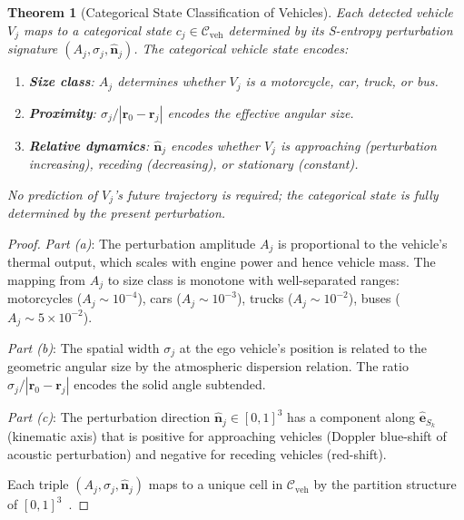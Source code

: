 \documentclass[twocolumn,10pt]{article}
\newtheorem{theorem}{Theorem}[section]
\theoremstyle{definition}
\theoremstyle{remark}
\begin{document}
\begin{theorem}[Categorical State Classification of Vehicles]\label{thm:vehicle-classification}
Each detected vehicle $V_j$ maps to a categorical state
$c_j \in \mathcal{C}_{\mathrm{veh}}$ determined by its S-entropy
perturbation signature $(A_j, \sigma_j, \hat{\mathbf{n}}_j)$. The
categorical vehicle state encodes:
\begin{enumerate}[label=(\alph*)]
  \item \textbf{Size class}: $A_j$ determines whether $V_j$ is a
    motorcycle, car, truck, or bus.
  \item \textbf{Proximity}: $\sigma_j / |\mathbf{r}_0 - \mathbf{r}_j|$
    encodes the effective angular size.
  \item \textbf{Relative dynamics}: $\hat{\mathbf{n}}_j$ encodes whether
    $V_j$ is approaching (perturbation increasing), receding (decreasing),
    or stationary (constant).
\end{enumerate}
No prediction of $V_j$'s future trajectory is required; the categorical
state is fully determined by the present perturbation.
\end{theorem}

\begin{proof}
\emph{Part (a)}: The perturbation amplitude $A_j$ is proportional to the
vehicle's thermal output, which scales with engine power and hence vehicle
mass. The mapping from $A_j$ to size class is monotone with well-separated
ranges: motorcycles ($A_j \sim 10^{-4}$), cars ($A_j \sim 10^{-3}$),
trucks ($A_j \sim 10^{-2}$), buses ($A_j \sim 5 \times 10^{-2}$).

\emph{Part (b)}: The spatial width $\sigma_j$ at the ego vehicle's
position is related to the geometric angular size by the atmospheric
dispersion relation. The ratio $\sigma_j / |\mathbf{r}_0 - \mathbf{r}_j|$
encodes the solid angle subtended.

\emph{Part (c)}: The perturbation direction $\hat{\mathbf{n}}_j \in
[0,1]^3$ has a component along $\hat{\mathbf{e}}_{S_k}$ (kinematic axis)
that is positive for approaching vehicles (Doppler blue-shift of acoustic
perturbation) and negative for receding vehicles (red-shift).

Each triple $(A_j, \sigma_j, \hat{\mathbf{n}}_j)$ maps to a unique cell
in $\mathcal{C}_{\mathrm{veh}}$ by the partition structure of
$[0,1]^3$~\cite{sachikonye2026partition}.
\end{proof}


\end{document}
